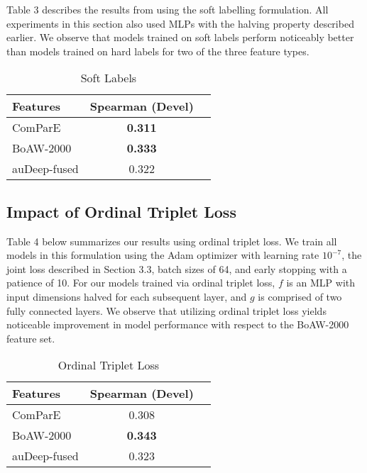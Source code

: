 Table 3 describes the results from using the soft labelling formulation. All experiments in this section also used MLPs with the halving property described earlier.
We observe that models trained on soft labels perform noticeably better than models trained on hard labels for two of the three feature types.

\begin{table}[h]
\centering
\caption{Soft Labels}
\label{spk_id}
\begin{tabular}{lcc}
                            Features    & {Spearman (Devel)} \\ \toprule
                 ComParE &  \textbf{0.311}           \\
                            BoAW-2000 &  \textbf{0.333}           \\
                            auDeep-fused     &  0.322           \\ \bottomrule  
\end{tabular}
\end{table}

\subsection{Impact of Ordinal Triplet Loss}

Table 4 below summarizes our results using ordinal triplet loss.
We train all models in this formulation using the Adam optimizer  %
with learning rate $10^{-7}$, the joint loss described in Section 3.3, batch sizes of 64, and early stopping with a patience of 10.
For our models trained via ordinal triplet loss, $f$ is an MLP with input dimensions halved for each subsequent layer, and $g$ is comprised of two fully connected layers.
We observe that utilizing ordinal triplet loss yields noticeable improvement in model performance with respect to the BoAW-2000 feature set.

\begin{table}[h]
\centering
\caption{Ordinal Triplet Loss}
\label{spk_id}
\begin{tabular}{lcc}
                Features    & {Spearman (Devel)} \\ \toprule
                ComParE &  0.308           \\
                BoAW-2000 &  \textbf{0.343}           \\
                auDeep-fused     &  0.323           \\ \bottomrule  
\end{tabular}
\end{table}

